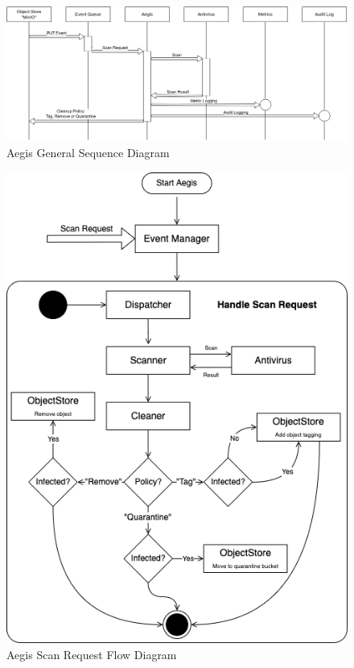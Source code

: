 \documentclass[12pt, conference, final, a4paper, onecolumn, compsoc]{IEEEtran}
\begin{document}
\begin{figure}[H]
  \centering \includegraphics[scale=0.53]{diagrams/general-sequence.png}
  \caption{Aegis General Sequence Diagram}
  \label{appendix:general-sequence}
\end{figure}

\begin{figure}[H]
  \centering \includegraphics[scale=0.5]{diagrams/flow-diagram.png}
  \caption{Aegis Scan Request Flow Diagram}
  \label{appendix:flow-diagram}
\end{figure}
\end{document}
